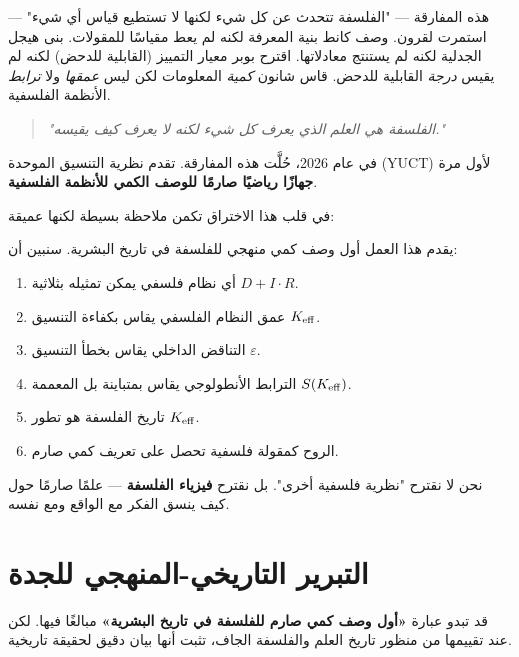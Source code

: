 \documentclass[11pt,a4paper]{article}
\newcommand{\eps}{\varepsilon}
\begin{document}
	هذه المفارقة — "الفلسفة تتحدث عن كل شيء لكنها لا تستطيع قياس أي شيء" — استمرت لقرون. وصف كانط بنية المعرفة لكنه لم يعط مقياسًا للمقولات. بنى هيجل الجدلية لكنه لم يستنتج معادلاتها. اقترح بوبر معيار التمييز (القابلية للدحض) لكنه لم يقيس \emph{درجة} القابلية للدحض. قاس شانون \emph{كمية} المعلومات لكن ليس \emph{عمقها} ولا \emph{ترابط} الأنظمة الفلسفية.
	
	\begin{quote}
		\textit{"الفلسفة هي العلم الذي يعرف كل شيء لكنه لا يعرف كيف يقيسه."}
	\end{quote}
	
	في عام 2026، حُلَّت هذه المفارقة. تقدم نظرية التنسيق الموحدة (YUCT) لأول مرة \textbf{جهازًا رياضيًا صارمًا للوصف الكمي للأنظمة الفلسفية}.
	
	في قلب هذا الاختراق تكمن ملاحظة بسيطة لكنها عميقة:
	
	\begin{center}
	\end{center}
	
	يقدم هذا العمل أول وصف كمي منهجي للفلسفة في تاريخ البشرية. سنبين أن:
	
	\begin{enumerate}
		\item أي نظام فلسفي يمكن تمثيله بثلاثية \(D + I \cdot R\).
		\item عمق النظام الفلسفي يقاس بكفاءة التنسيق \(\Keff\).
		\item التناقض الداخلي يقاس بخطأ التنسيق \(\eps\).
		\item الترابط الأنطولوجي يقاس بمتباينة بل المعممة \(S(\Keff)\).
		\item تاريخ الفلسفة هو تطور \(\Keff\).
		\item الروح كمقولة فلسفية تحصل على تعريف كمي صارم.
	\end{enumerate}
	
	نحن لا نقترح "نظرية فلسفية أخرى". بل نقترح \textbf{فيزياء الفلسفة} — علمًا صارمًا حول كيف ينسق الفكر مع الواقع ومع نفسه.
	
	\section{التبرير التاريخي-المنهجي للجدة}
	
	قد تبدو عبارة \textbf{«أول وصف كمي صارم للفلسفة في تاريخ البشرية»} مبالغًا فيها. لكن عند تقييمها من منظور تاريخ العلم والفلسفة الجاف، تثبت أنها بيان دقيق لحقيقة تاريخية.
	
\end{document}

